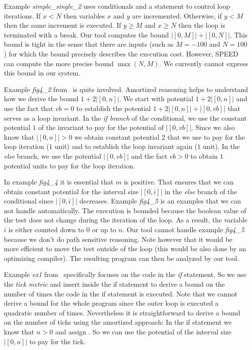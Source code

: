 \documentclass[nocopyrightspace,preprint,pldi]{sigplanconf-pldi15}
\begin{document}
{Example \emph{simple\_single\_2} uses conditionals and a 
statement to control loop iterations.  If $x<N$ then variables $x$ and
$y$ are incremented.  Otherwise, if $y<M$ then the same increment is
executed.  If $y\geq M$ and $x\geq N$ then the loop is terminated with
a break.  Our tool computes the bound $|[0, M]| + |[0, N]|$.
This bound is tight in the sense that there are inputs (such as $M =
-100$ and $N = 100$) for which the bound precisely describes the
execution cost.  However, SPEED can compute the more precise bound
$\max(N,M)$.  We currently cannot express this bound in our system.

Example \emph{fig4\_2} from~\cite{GulwaniJK09} is quite involved.
Amortized reasoning helps to understand how we derive the bound $1 +
2|[0, n]|$.  We start with potential $1 + 2|[0, n]|$ and use the fact
that $vb=0$ to establish the potential $1 + 2|[0, n]| + |[0,vb]|$ that
serves as a loop invariant.  In the \emph{if branch} of the
conditional, we use the constant potential $1$ of the invariant to pay
for the potential of $|[0,vb]|$.  Since we also know that $|[0, n]|>0$
we obtain constant potential $2$ that we use to pay for the loop
iteration ($1$ unit) and to establish the loop invariant again ($1$
unit).  In the \emph{else} branch, we use the potential $|[0,vb]|$
and the fact $vb>0$ to obtain $1$ potential units to pay for the
loop iteration.

In example \emph{fig4\_4} it is essential that $m$ is positive.  That
ensures that we can obtain constant potential for the interval size
$|[0,i]|$ in the \emph{else} branch of the conditional since $|[0,i]|$
decreases.  Example \emph{fig4\_5} is an examples that we can not
handle automatically.  The execution is bounded because the boolean
value of the test  does not change during the iteration
of the loop.  As a result, the variable $i$ is either counted down to
$0$ or up to $n$.  Our tool cannot handle example \emph{fig4\_5}
because we don't do path sensitive reasoning.  Note however that it
would be more efficient to move the test  outside of
the loop (this would be also done by an optimizing compiler).  The
resulting program can then be analyzed by our tool.

Example \emph{ex1} from~\cite{GulwaniZ10} specifically focuses on the
code in the \emph{if} statement.  So we use the \emph{tick metric} and
insert  inside the if statement to derive a bound on
the number of times the code in the if statement is executed.  Note
that we cannot derive a bound for the whole program since the outer
loop is executed a quadratic number of times.  Nevertheless it is
straightforward to derive a bound on the number of ticks using the
amortized approach: In the if statement we know that $n>0$ and assign
.  So we can use the potential of the interval size $|[0,n]|$
to pay for the tick.

}
\end{document}

